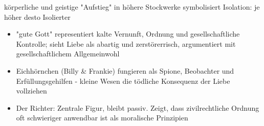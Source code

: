 körperliche und geistige "Aufstieg" in höhere Stockwerke symbolisiert Isolation: je höher desto Isolierter

\begin{itemize}
    \item "gute Gott" representiert kalte Vernunft, Ordnung und gesellschaftliche Kontrolle; sieht Liebe als abartig und zerstörerrisch, argumentiert mit gesellschaftlichem Allgemeinwohl
    \item Eichhörnchen (Billy \& Frankie) fungieren als Spione, Beobachter und Erfüllungsgehilfen - kleine Wesen die tödliche Konsequenz der Liebe vollziehen
    \item Der Richter: Zentrale Figur, bleibt passiv. Zeigt, dass zivilrechtliche Ordnung oft schwieriger anwendbar ist als moralische Prinzipien
\end{itemize}

